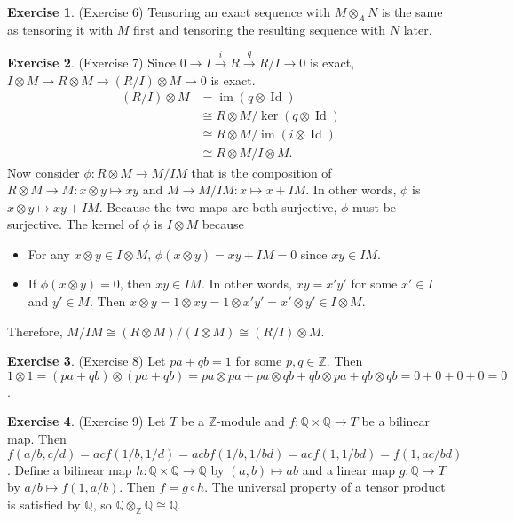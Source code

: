 \documentclass[12pt, psamsfonts]{amsart}
\theoremstyle{definition}
\newtheorem*{exer}{Exercise}
\theoremstyle{remark}
\DeclareMathOperator{\Id}{Id}
\DeclareMathOperator{\im}{im}
\numberwithin{equation}{section}
\begin{document}
\begin{exer}{(Exercise 6)}
  Tensoring an exact sequence with $M \otimes_A N$ is the same as tensoring it with $M$ first and tensoring the resulting sequence with $N$ later.
\end{exer}

\begin{exer}{(Exercise 7)}
  Since $0 \rightarrow I \xrightarrow{i} R \xrightarrow{q} R / I \rightarrow 0$ is exact, $I \otimes M \rightarrow R \otimes M \rightarrow (R / I) \otimes M \rightarrow 0$ is exact.
  \begin{align*}
    (R / I) \otimes M
      &= \im(q \otimes \Id) \\
      &\cong R \otimes M / \ker(q \otimes \Id) \\
      &\cong R \otimes M / \im(i \otimes \Id) \\
      &\cong R \otimes M / I \otimes M.
  \end{align*}
  Now consider $\phi: R \otimes M \rightarrow M / IM$ that is the composition of $R \otimes M \rightarrow M: x \otimes y \mapsto xy$ and $M \rightarrow M / IM: x \mapsto x + IM$.
  In other words, $\phi$ is $x \otimes y \mapsto xy + IM$.
  Because the two maps are both surjective, $\phi$ must be surjective.
  The kernel of $\phi$ is $I \otimes M$ because
  \begin{itemize}
    \item
      For any $x \otimes y \in I \otimes M$, $\phi(x \otimes y) = xy + IM = 0$ since $xy \in IM$.
    \item
      If $\phi(x \otimes y) = 0$, then $xy \in IM$.
      In other words, $xy = x'y'$ for some $x' \in I$ and $y' \in M$.
      Then $x \otimes y = 1 \otimes xy = 1 \otimes x'y' = x' \otimes y' \in I \otimes M$.
  \end{itemize}
  Therefore, $M / IM \cong (R \otimes M) / (I \otimes M) \cong (R / I) \otimes M$.
\end{exer}

\begin{exer}{(Exercise 8)}
  Let $pa + qb = 1$ for some $p, q \in \mathbb{Z}$.
  Then $1 \otimes 1 = (pa + qb) \otimes (pa + qb) = pa \otimes pa + pa \otimes qb + qb \otimes pa + qb \otimes qb = 0 + 0 + 0 + 0 = 0$.
\end{exer}

\begin{exer}{(Exercise 9)}
  Let $T$ be a $\mathbb{Z}$-module and $f: \mathbb{Q} \times \mathbb{Q} \rightarrow T$ be a bilinear map.
  Then $f(a/b, c/d) = acf(1/b, 1/d) = acbf(1/b, 1/bd) = acf(1, 1/bd) = f(1, ac/bd)$.
  Define a bilinear map $h: \mathbb{Q} \times \mathbb{Q} \rightarrow \mathbb{Q}$ by $(a, b) \mapsto ab$ and a linear map $g: \mathbb{Q} \rightarrow T$ by $a/b \mapsto f(1, a/b)$.
  Then $f = g \circ h$.
  The universal property of a tensor product is satisfied by $\mathbb{Q}$, so $\mathbb{Q} \otimes_{\mathbb{Z}} \mathbb{Q} \cong \mathbb{Q}$.
\end{exer}
\end{document}
